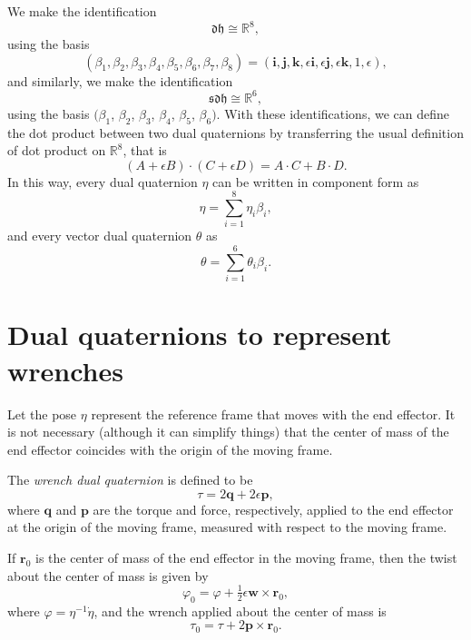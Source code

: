 \documentclass[reqno,12pt]{amsart}
\newcommand\bi{\bm i}
\newcommand\bj{\bm j}
\newcommand\bk{\bm k}
\newcommand\setdualquat{\mathfrak d \mathfrak h}
\newcommand\setvectordualquat{\mathfrak{s}\mathfrak d \mathfrak h}
\begin{document}
We make the identification
\begin{equation}
\setdualquat \cong \mathbb R^8,
\end{equation}
using the basis
\begin{equation}
\label{dual quaternion basis}
(\beta_1, \beta_2, \beta_3, \beta_4, \beta_5, \beta_6, \beta_7, \beta_8) = (\bi, \bj, \bk, \epsilon\bi, \epsilon\bj, \epsilon\bk, 1, \epsilon),
\end{equation}
and similarly, we make the identification
\begin{equation}
\setvectordualquat \cong \mathbb R^6,
\end{equation}
using the basis $(\beta_1$, $\beta_2$, $\beta_3$, $\beta_4$, $\beta_5$, $\beta_6)$.  With these identifications, we can define the dot product between two dual quaternions by transferring the usual definition of dot product on $\mathbb R^8$, that is
\begin{equation}
(A + \epsilon B) \cdot (C + \epsilon D) = A \cdot C + B \cdot D.
\end{equation}
In this way, every dual quaternion $\eta$ can be written in component form as
\begin{equation}
\eta = \sum_{i=1}^8 \eta_i \beta_i ,
\end{equation}
and every vector dual quaternion $\theta$ as
\begin{equation}
\theta = \sum_{i=1}^6 \theta_i \beta_i .
\end{equation}

\section{Dual quaternions to represent wrenches}

Let the pose $\eta$ represent the reference frame that moves with the end effector.  It is not necessary (although it can simplify things) that the center of mass of the end effector coincides with the origin of the moving frame.

The \emph{wrench dual quaternion} is defined to be
\begin{equation}
\label{wrench as quaternion}
\tau = 2 \bm q + 2 \epsilon \bm p,
\end{equation}
where $\bm q$ and $\bm p$ are the torque and force, respectively, applied to the end effector at the origin of the moving frame, measured with respect to the moving frame.

If $\bm r_0$ is the center of mass of the end effector in the moving frame, then the twist about the center of mass is given by
\begin{equation}
\label{twist correction}
\varphi_0 = 
\varphi + \tfrac12\epsilon\bm w \times \bm r_0,
\end{equation}
where $\varphi = \eta^{-1} \dot \eta$, and the wrench applied about the center of mass is
\begin{equation}
\label{torque correction}
\tau_0 = 
\tau + 2 \bm p \times \bm r_0.
\end{equation}
\end{document}
